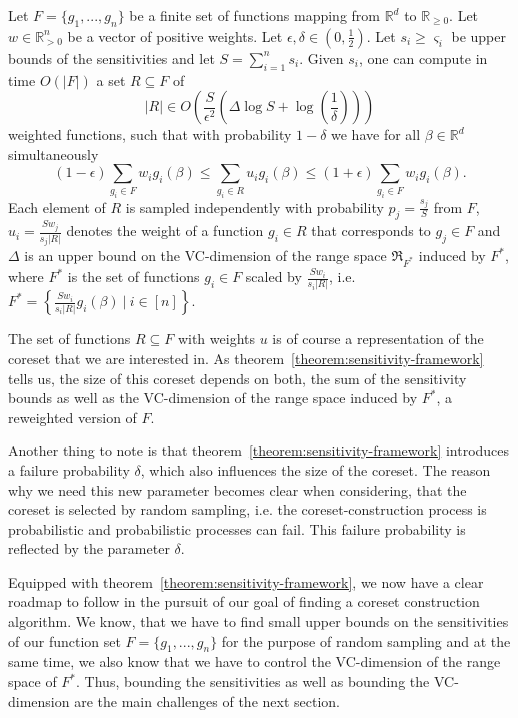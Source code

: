 \begin{theorem}
    \label{theorem:sensitivity-framework}
    Let $F = \{ g_1, ..., g_n \}$ be a finite set of functions
    mapping from $\mathbb{R}^d$ to $\mathbb{R}_{\geq 0}$.
    Let $w \in \mathbb{R}^n_{>0}$ be a vector of positive weights.
    Let $\epsilon, \delta \in (0, \frac{1}{2})$.
    Let $s_i \geq \varsigma_i$ be upper bounds of the sensitivities and
    let $S = \sum_{i=1}^n s_i$.
    Given $s_i$, one can compute in time $O(|F|)$ a set
    $R \subseteq F$ of
    \begin{equation*}
        |R| \in O \left( \frac{S}{\epsilon^2} \left( \Delta \log S + \log \left( \frac{1}{\delta} \right) \right) \right)
    \end{equation*}
    weighted functions, such that with probability $1 - \delta$ we have
    for all $\beta \in \mathbb{R}^d$ simultaneously
    \begin{equation*}
        (1-\epsilon) \sum_{g_i \in F} w_i g_i(\beta) \leq \sum_{g_i \in R} u_i g_i(\beta) \leq (1 + \epsilon) \sum_{g_i \in F} w_i g_i(\beta).
    \end{equation*}
    Each element of $R$ is sampled independently with probability
    $p_j = \frac{s_j}{S}$ from $F$, $u_i = \frac{S w_j}{s_j |R|}$
    denotes the weight of a function $g_i \in R$ that corresponds to
    $g_j \in F$ and $\Delta$ is an upper bound on the
    VC-dimension of the range space $\mathfrak{R}_{F^\ast}$ induced by
    $F^\ast$, where $F^\ast$ is the set of functions $g_i \in F$
    scaled by $\frac{S w_i}{s_i |R|}$, i.e.
    $F^\ast = \left\{ \frac{S w_i}{s_i |R|} g_i(\beta) \ |\ i \in [n] \right\}$.
\end{theorem}

The set of functions $R \subseteq F$ with weights $u$ is of course
a representation of
the coreset that we are interested in.
As theorem~\ref{theorem:sensitivity-framework} tells us, the
size of this coreset depends on both, the sum of the sensitivity bounds
as well as the VC-dimension of the range space induced by $F^\ast$,
a reweighted version of $F$.

Another thing to note is that theorem~\ref{theorem:sensitivity-framework}
introduces a failure probability $\delta$, which also influences the
size of the coreset. The reason why we need this new parameter becomes
clear when considering, that the coreset is selected by random sampling,
i.e. the coreset-construction process is probabilistic and
probabilistic processes can fail. This failure probability is reflected
by the parameter $\delta$.

Equipped with theorem~\ref{theorem:sensitivity-framework}, we now have
a clear roadmap to follow in the pursuit of our goal of finding a
coreset construction
algorithm. We know, that we have to find small upper bounds on
the sensitivities of our function set $F = \{g_1, ..., g_n\}$
for the purpose of random sampling and at the
same time, we also know that we have to control the VC-dimension of the
range space of $F^\ast$.
Thus, bounding the sensitivities as well as bounding the VC-dimension
are the main challenges of the next section.
